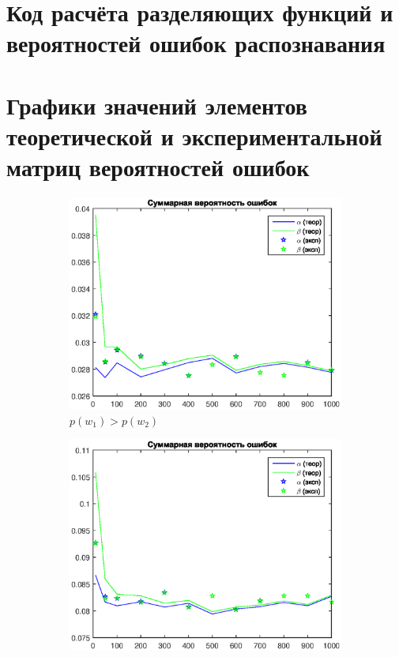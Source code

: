 \documentclass[10pt]{article} %
\begin{document}
\begin{spacing}{1}
\section*{Код расчёта разделяющих функций и вероятностей ошибок распознавания}
 
\section*{Графики  значений  элементов  теоретической  и экспериментальной матриц вероятностей ошибок}
\begin{figure}[h]
	\centering
	\begin{subfigure}{.5\textwidth}
		\centering
		\includegraphics[width=1.0\linewidth]{1.eps}
		\caption{$p(w_1) > p(w_2)$}
	\end{subfigure}%
	\begin{subfigure}{.5\textwidth}
		\centering
		\includegraphics[width=1.0\linewidth]{2.eps}

\end{subfigure}
\end{figure}
\end{spacing}
\end{document}
